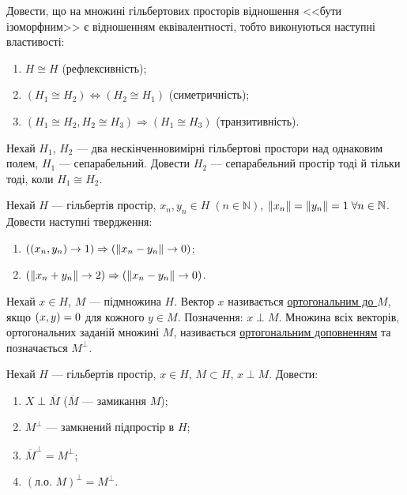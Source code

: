 \begin{exercise}
    Довести, що на множині гільбертових просторів відношення <<бути ізоморфним>>
    є відношенням еквівалентності, тобто виконуються наступні властивості:
    \begin{enumerate}[label=\ukr*)]
        \item $H \cong H$ (рефлексивність);
        \item $(H_1 \cong H_2) \Leftrightarrow (H_2 \cong H_1)$ (симетричність);
        \item $(H_1 \cong H_2, H_2 \cong H_3) \Rightarrow (H_1 \cong H_3)$ (транзитивність).
    \end{enumerate}
\end{exercise}

\begin{exercise}
    Нехай $H_1$, $H_2$ --- два нескінченновимірні гільбертові простори над однаковим полем, $H_1$ --- сепарабельний.
    Довести $H_2$ --- сепарабельний простір тоді й тільки тоді, коли $H_1 \cong H_2$.
\end{exercise}

\begin{exercise}
    Нехай $H$ --- гільбертів простір, $x_n, y_n \in H \; (n \in \mathbb{N})$, $\left\lVert x_n\right\rVert = \left\lVert y_n\right\rVert = 1 \; \forall n \in \mathbb{N}$.
    Довести наступні твердження:
    \begin{enumerate}[label=\ukr*)]
        \item $(\left(x_n, y_n\right) \rightarrow 1) \Rightarrow (\left\lVert x_n - y_n\right\rVert \rightarrow 0)$;
        \item $(\left\lVert x_n + y_n\right\rVert \rightarrow 2) \Rightarrow (\left\lVert x_n - y_n\right\rVert \rightarrow 0)$.
    \end{enumerate}
\end{exercise}

\begin{theory}
    Нехай $x \in H$, $M$ --- підмножина $H$. Вектор $x$ називається \uline{ортогональним до $M$},
    якщо $\left(x, y\right) = 0$ для кожного $y \in M$. Позначення: $x \perp M$.
    Множина всіх векторів, ортогональних заданій множині $M$, називається \uline{ортогональним доповненням} 
    та позначається $M^\perp$.
\end{theory}

\begin{exercise}
    Нехай $H$ --- гільбертів простір, $x\in H$, $M \subset H$, $x \perp M$.
    Довести:
    \begin{enumerate}[label=\ukr*)]
        \item $X \perp \overline{M}$ ($\overline{M}$ --- замикання $M$);
        \item $M^\perp$ --- замкнений підпростір в $H$;
        \item $\overline{M}^\perp = M^\perp$;
        \item $(\text{л.о. } M)^\perp = M^\perp$.
    \end{enumerate}
\end{exercise}

